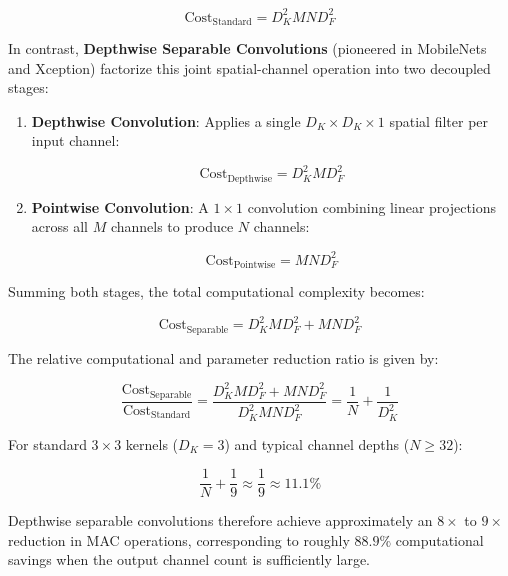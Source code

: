 \begin{equation}
    \text{Cost}_{\text{Standard}}
    = D_K^2 M N D_F^2
\end{equation}

In contrast, \textbf{Depthwise Separable Convolutions} (pioneered in MobileNets and Xception) factorize this joint spatial-channel operation into two decoupled stages:

\begin{enumerate}
    \item \textbf{Depthwise Convolution}: Applies a single $D_K \times D_K \times 1$ spatial filter per input channel:

    \begin{equation}
        \text{Cost}_{\text{Depthwise}}
        = D_K^2 M D_F^2
    \end{equation}

    \item \textbf{Pointwise Convolution}: A $1 \times 1$ convolution combining linear projections across all $M$ channels to produce $N$ channels:

    \begin{equation}
        \text{Cost}_{\text{Pointwise}}
        = M N D_F^2
    \end{equation}
\end{enumerate}

Summing both stages, the total computational complexity becomes:

\begin{equation}
    \text{Cost}_{\text{Separable}}
    = D_K^2 M D_F^2 + M N D_F^2
\end{equation}

The relative computational and parameter reduction ratio is given by:

\begin{equation}
    \frac{\text{Cost}_{\text{Separable}}}
    {\text{Cost}_{\text{Standard}}}
    = \frac{D_K^2 M D_F^2 + M N D_F^2}
    {D_K^2 M N D_F^2}
    = \frac{1}{N} + \frac{1}{D_K^2}
\end{equation}

For standard $3 \times 3$ kernels ($D_K=3$) and typical channel depths ($N \geq 32$):

\begin{equation}
    \frac{1}{N}+\frac{1}{9}
    \approx \frac{1}{9}
    \approx 11.1\%
\end{equation}

Depthwise separable convolutions therefore achieve approximately an $8\times$ to $9\times$ reduction in MAC operations, corresponding to roughly $88.9\%$ computational savings when the output channel count is sufficiently large.

